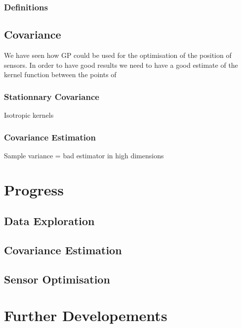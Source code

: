\documentclass[12pt,twoside]{report}
\begin{document}
\subsection{Definitions}

\section{Covariance}

We have seen how GP could be used for the optimisation of the position of sensors. In order to have good results we need to have a good estimate of the kernel function between the points of

\subsection{Stationnary Covariance}

Isotropic kernels

\subsection{Covariance Estimation}

Sample variance = bad estimator in high dimensions










\chapter{Progress}

\section{Data Exploration}

\section{Covariance Estimation}

\section{Sensor Optimisation}


\cite{cressie_statistics_1991}
\cite{arcucci_effective_2018}

\chapter{Further Developements}




\end{document}
